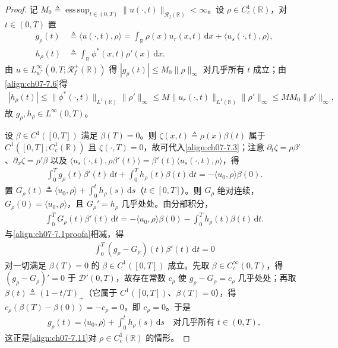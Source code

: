 ﻿\documentclass[../../main.tex]{subfiles}%
\begin{document}
\begin{proof}
记 $M_0\triangleq\operatorname*{ess\,sup}_{t\in(0,T)}\|u(\cdot,t)\|_{\mathscr{R}_f(\mathbb{R})}<\infty$。设 $\rho\in C_c^1(\mathbb{R})$，对 $t\in(0,T)$ 置
\begin{align*}
g_\rho(t)&\triangleq\langle u(\cdot,t),\rho\rangle
=\int_{\mathbb{R}}\rho(x)u_r(x,t)\,\mathrm{d}x+\langle u_s(\cdot,t),\rho\rangle,\\
h_\rho(t)&\triangleq\int_{\mathbb{R}}\phi^*(x,t)\rho'(x)\,\mathrm{d}x.
\end{align*}
由 $u\in L^\infty_{w^*}(0,T;\mathscr{R}_f^+(\mathbb{R}))$ 得 $|g_\rho(t)|\leqslant M_0\|\rho\|_\infty$ 对几乎所有 $t$ 成立；由\eqref{align:ch07-7.6}得
\begin{align*}
|h_\rho(t)|\leqslant\|\phi^*(\cdot,t)\|_{L^1(\mathbb{R})}\|\rho'\|_\infty
\leqslant M\|u_r(\cdot,t)\|_{L^1(\mathbb{R})}\|\rho'\|_\infty
\leqslant MM_0\|\rho'\|_\infty,
\end{align*}
故 $g_\rho,h_\rho\in L^\infty(0,T)$。

设 $\beta\in C^1([0,T])$ 满足 $\beta(T)=0$。则 $\zeta(x,t)\triangleq\rho(x)\beta(t)$ 属于 $C^1([0,T];C_c^1(\mathbb{R}))$ 且 $\zeta(\cdot,T)=0$，故可代入\eqref{align:ch07-7.3}；注意 $\partial_t\zeta=\rho\beta'$、$\partial_x\zeta=\rho'\beta$ 以及 $\langle u_s(\cdot,t),\rho\beta'(t)\rangle=\beta'(t)\langle u_s(\cdot,t),\rho\rangle$，得
\begin{align}
\int_0^Tg_\rho(t)\beta'(t)\,\mathrm{d}t+\int_0^Th_\rho(t)\beta(t)\,\mathrm{d}t
=-\langle u_0,\rho\rangle\beta(0). \label{align:ch07-7.1proofa}
\end{align}
置 $G_\rho(t)\triangleq\langle u_0,\rho\rangle+\int_0^th_\rho(s)\,\mathrm{d}s$（$t\in[0,T]$）。则 $G_\rho$ 绝对连续，$G_\rho(0)=\langle u_0,\rho\rangle$，且 $G_\rho'=h_\rho$ 几乎处处。由分部积分，
\begin{align*}
\int_0^TG_\rho(t)\beta'(t)\,\mathrm{d}t
=-\langle u_0,\rho\rangle\beta(0)-\int_0^Th_\rho(t)\beta(t)\,\mathrm{d}t .
\end{align*}
与\eqref{align:ch07-7.1proofa}相减，得
\begin{align*}
\int_0^T(g_\rho-G_\rho)(t)\beta'(t)\,\mathrm{d}t=0
\end{align*}
对一切满足 $\beta(T)=0$ 的 $\beta\in C^1([0,T])$ 成立。先取 $\beta\in C_c^\infty(0,T)$，得 $(g_\rho-G_\rho)'=0$ 于 $\mathcal{D}'(0,T)$，故存在常数 $c_\rho$ 使 $g_\rho-G_\rho=c_\rho$ 几乎处处；再取 $\beta(t)\triangleq(1-t/T)_+$（它属于 $C^1([0,T])$、$\beta(T)=0$），得 $c_\rho(\beta(T)-\beta(0))=-c_\rho=0$，即 $c_\rho=0$。于是
\begin{align}
g_\rho(t)=\langle u_0,\rho\rangle+\int_0^th_\rho(s)\,\mathrm{d}s
\quad\text{对几乎所有 }t\in(0,T), \label{align:ch07-7.1proofb}
\end{align}
这正是\eqref{align:ch07-7.11}对 $\rho\in C_c^1(\mathbb{R})$ 的情形。


\end{proof}
\end{document}

